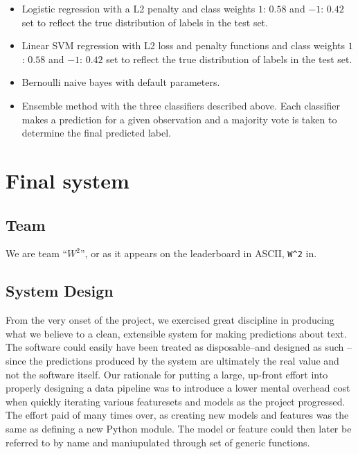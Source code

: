 \documentclass[
10pt, %
a4paper, %
oneside, %
headinclude,footinclude, %
BCOR5mm, %
]{scrartcl}
\begin{document}
\begin{itemize}
	\item Logistic regression with a L2 penalty and class weights $1$: $0.58$ and
	$-1$: $0.42$ set to reflect the true distribution of labels in the test set.

	\item Linear SVM regression with L2 loss and penalty functions and class 
	weights $1$: $0.58$ and $-1$: $0.42$ set to reflect the true distribution of
	labels in the test set.

	\item Bernoulli naive bayes with default parameters.

	\item Ensemble method with the three classifiers described above. Each 
	classifier makes a prediction for a given observation and a majority vote is
	taken to determine the final predicted label.
\end{itemize}

\break
\section{Final system}

\subsection{Team}

We are team ``$W^2$'', or as it appears on the leaderboard in ASCII,
\texttt{W\string^2} in.

\subsection{System Design}

From the very onset of the project, we exercised great discipline in producing
what we believe to a clean, extensible system for making predictions about text.
The software could easily have been treated as disposable--and designed as such
--since the predictions produced by the system are ultimately the real value and
not the software itself. Our rationale for putting a large, up-front effort into
properly designing a data pipeline was to introduce a lower mental overhead cost
when quickly iterating various featuresets and models as the project progressed.
The effort paid of many times over, as creating new models and features was the
same as defining a new Python module. The model or feature could then later be
referred to by name and maniupulated through set of generic functions.
\end{document}
